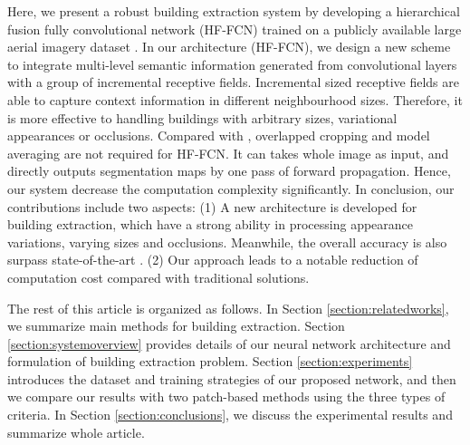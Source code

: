 \documentclass[runningheads]{llncs}
\begin{document}
  Here, we present a robust building extraction system by developing a hierarchical fusion fully convolutional network (HF-FCN) trained on a publicly available large aerial imagery dataset \cite{Mnih2013Machine}. In our architecture (HF-FCN), we design a new scheme to integrate multi-level semantic information generated from convolutional layers with a group of incremental receptive fields. Incremental sized receptive fields are able to capture context information in different neighbourhood sizes. Therefore, it is more effective to handling buildings with arbitrary sizes, variational appearances or occlusions. Compared with \cite{Mnih2013Machine,Saito2016Multiple}, overlapped cropping and model averaging are not required for HF-FCN. It can takes whole image as input, and directly outputs segmentation maps by one pass of forward propagation. Hence, our system decrease the computation complexity significantly. In conclusion, our contributions include two aspects: (1) A new architecture is developed for building extraction, which have a strong ability in processing appearance variations,  varying sizes and occlusions. Meanwhile, the overall accuracy is also surpass state-of-the-art \cite{Saito2016Multiple}. (2) Our approach leads to a notable reduction of computation cost  compared with traditional solutions.
  
  
   The rest of this article is organized as follows. In Section \ref{section:relatedworks}, we summarize main   methods for building extraction. Section \ref{section:systemoverview} provides details of our neural network architecture and formulation of building extraction problem. Section \ref{section:experiments} introduces the dataset and training strategies of our proposed network, and then we compare our results with two patch-based methods using the three types of criteria. In Section \ref{section:conclusions}, we discuss the experimental results and summarize whole article. 
   
   
\end{document}
